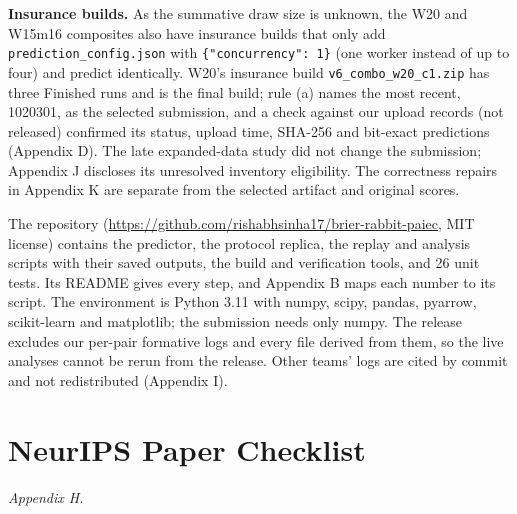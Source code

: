 \documentclass[
]{article}
\begin{document}
\textbf{Insurance builds.} As the summative draw size is unknown, the
W20 and W15m16 composites also have insurance builds that only add
\texttt{prediction\_config.json} with \texttt{\{"concurrency":\ 1\}}
(one worker instead of up to four) and predict identically. W20's
insurance build \texttt{v6\_combo\_w20\_c1.zip} has three Finished runs
and is the final build; rule (a) names the most recent, 1020301, as the
selected submission, and a check against our upload records (not
released) confirmed its status, upload time, SHA-256 and bit-exact
predictions (Appendix D). The late expanded-data study did not change
the submission; Appendix J discloses its unresolved inventory
eligibility. The correctness repairs in Appendix K are separate from the
selected artifact and original scores.

The repository
(\url{https://github.com/rishabhsinha17/brier-rabbit-paiec}, MIT
license) contains the predictor, the protocol replica, the replay and
analysis scripts with their saved outputs, the build and verification
tools, and 26 unit tests. Its README gives every step, and Appendix B
maps each number to its script. The environment is Python 3.11 with
numpy, scipy, pandas, pyarrow, scikit-learn and matplotlib; the
submission needs only numpy. The release excludes our per-pair formative
logs and every file derived from them, so the live analyses cannot be
rerun from the release. Other teams' logs are cited by commit and not
redistributed (Appendix I).

\section{NeurIPS Paper Checklist}\label{neurips-paper-checklist}

\emph{Appendix H.}
\end{document}
